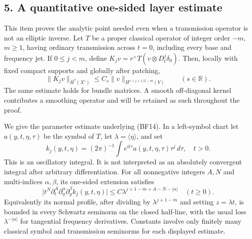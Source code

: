 \documentclass[
  11pt,
]{article}
\makeatletter
\let\ReaderOriginalAnchorStart\hyper@anchorstart
\let\ReaderOriginalAnchorEnd\hyper@anchorend
\let\ReaderPendingAliases\@empty
\def\ReaderArmAliases#1{\gdef\ReaderPendingAliases{#1}}
\def\hyper@anchorstart#1{\ReaderIfNativeAnchorTF{#1}{\ReaderPendingAliases\global\let\ReaderPendingAliases\@empty}{}\ReaderOriginalAnchorStart{#1}}
\makeatother
\begin{document}
\ReaderArmAliases{\ReaderOriginalAnchorStart{AN03-GFB-005}\ReaderOriginalAnchorEnd\begingroup\expandafter\def\csname @currentHref\endcsname{AN03-GFB-005}\label{AN03-GFB-005}\endgroup\ReaderOriginalAnchorStart{an03-gfb-005-a-quantitative-one-sided-layer-estimate}\ReaderOriginalAnchorEnd\begingroup\expandafter\def\csname @currentHref\endcsname{an03-gfb-005-a-quantitative-one-sided-layer-estimate}\label{an03-gfb-005-a-quantitative-one-sided-layer-estimate}\endgroup\ReaderOriginalAnchorStart{5-a-quantitative-one-sided-layer-estimate}\ReaderOriginalAnchorEnd\begingroup\expandafter\def\csname @currentHref\endcsname{5-a-quantitative-one-sided-layer-estimate}\label{5-a-quantitative-one-sided-layer-estimate}\endgroup\ReaderOriginalAnchorStart{a-quantitative-one-sided-layer-estimate}\ReaderOriginalAnchorEnd}
\subsection{5. A quantitative one-sided layer
estimate}\label{a-quantitative-one-sided-layer-estimate}

This item proves the analytic point needed even when a transmission
operator is not an elliptic inverse. Let \(T\) be a proper classical
operator of integer order \(-m\), \(m\geq1\), having ordinary
transmission across \(t=0\), including every base and frequency jet. If
\(0\leq j<m\), define \(K_jv=r^+T(v\otimes D_t^j\delta_0)\). Then,
locally with fixed compact supports and globally after patching, \[
 \|K_jv\|_{\bar H^s(X^\circ)}
 \leq C_s\|v\|_{H^{s+j+1/2-m}(Y)}
 \qquad(s\in\mathbb R).
 \tag{BF14}
\] The same estimate holds for bundle matrices. A smooth off-diagonal
kernel contributes a smoothing operator and will be retained as such
throughout the proof.

We give the parameter estimate underlying (BF14). In a left-symbol chart
let \(a(y,t,\eta,\tau)\) be the symbol of \(T\), let
\(\lambda=\langle\eta\rangle\), and set \[
 k_j(y,t,\eta)=(2\pi)^{-1}\int e^{it\tau}
                  a(y,t,\eta,\tau)\tau^j\,d\tau,\quad t>0.
 \tag{BF15}
\] This is an oscillatory integral. It is not interpreted as an
absolutely convergent integral after arbitrary differentiation. For all
nonnegative integers \(A,N\) and multi-indices \(\alpha,\beta\), its
one-sided extension satisfies \[
 \big|t^N\partial_t^A\partial_\eta^\alpha\partial_y^\beta
                      k_j(y,t,\eta)\big|
 \leq C\lambda^{j+1-m+A-N-|\alpha|}
 \quad(t\geq0).
 \tag{BF16}
\] Equivalently its normal profile, after dividing by
\(\lambda^{j+1-m}\) and setting \(z=\lambda t\), is bounded in every
Schwartz seminorm on the closed half-line, with the usual loss
\(\lambda^{-|\alpha|}\) for tangential frequency derivatives. Constants
involve only finitely many classical symbol and transmission seminorms
for each displayed estimate.
\end{document}
